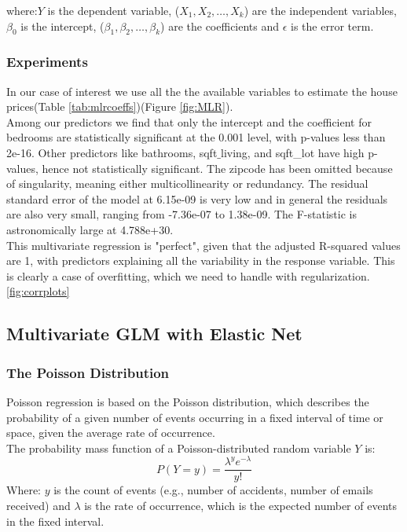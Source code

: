 \documentclass[a4paper, 9pt]{article}
\begin{document}
\begin{multicols}{2}
where:$Y$ is the dependent variable, ($X_1, X_2,\dots,X_k$) are the independent variables, $\beta_0$ is the intercept, ($\beta_1,\beta_2, \dots, \beta_k$) are the coefficients and $\epsilon$ is the error term.\\
\subsubsection*{Experiments}
In our case of interest we use all the the available variables to estimate the house prices(Table \ref{tab:mlrcoeffs})(Figure \ref{fig:MLR}).\\
Among our predictors we find that only the intercept and the coefficient for bedrooms are statistically significant at the 0.001 level, with p-values less than 2e-16. Other predictors like bathrooms, sqft$\_$living, and sqft{\_}lot have high p-values, hence not statistically significant. The zipcode has been omitted because of singularity, meaning either multicollinearity or redundancy. The residual standard error of the model at 6.15e-09 is very low and in general the residuals are also very small, ranging from -7.36e-07 to 1.38e-09. The F-statistic is astronomically large at 4.788e+30.\\
This multivariate regression is "perfect", given that the adjusted R-squared values are 1, with predictors explaining all the variability in the response variable. This is clearly a case of overfitting, which we need to handle with regularization. \ref{fig:corrplots}


\subsection{Multivariate GLM with Elastic Net} \vspace{-3pt}
\subsubsection*{The Poisson Distribution}
Poisson regression is based on the Poisson distribution, which describes the probability of a given number of events occurring in a fixed interval of time or space, given the average rate of occurrence.\\
The probability mass function of a Poisson-distributed random variable $Y$ is:
\begin{equation}
P(Y=y)= \frac{\lambda^ye^{-\lambda}}{y!}
\end{equation}
Where: $y$ is the count of events (e.g., number of accidents, number of emails received) and $\lambda$ is the rate of occurrence, which is the expected number of events in the fixed interval.

\end{multicols}
\end{document}
